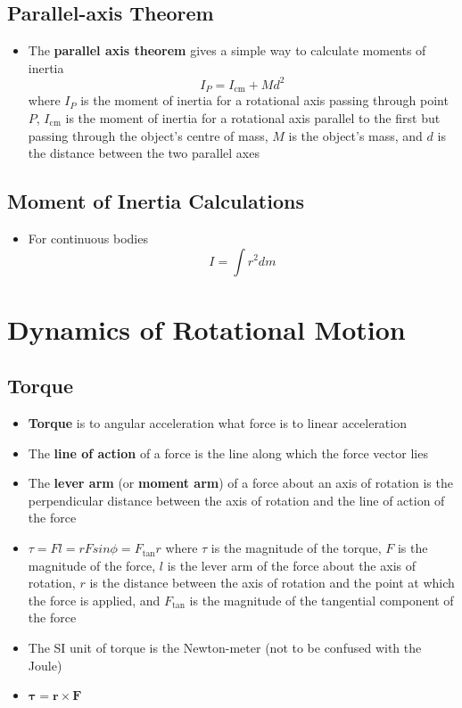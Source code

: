 \documentclass{article}
\begin{document}
\subsection{Parallel-axis Theorem}

\begin{itemize}
    \item The \textbf{parallel axis theorem} gives a simple way to calculate moments of inertia \[I_P=I_\textrm{cm}+Md^2\] where $I_P$ is the moment of inertia for a rotational axis passing through point $P$, $I_\textrm{cm}$ is the moment of inertia for a rotational axis parallel to the first but passing through the object's centre of mass, $M$ is the object's mass, and $d$ is the distance between the two parallel axes
\end{itemize}

\subsection{Moment of Inertia Calculations}

\begin{itemize}
    \item For continuous bodies \[I=\int r^2 dm\]
\end{itemize}

\section{Dynamics of Rotational Motion}

\subsection{Torque}

\begin{itemize}
    \item \textbf{Torque} is to angular acceleration what force is to linear acceleration

    \item The \textbf{line of action} of a force is the line along which the force vector lies

    \item The \textbf{lever arm} (or \textbf{moment arm}) of a force about an axis of rotation is the perpendicular distance between the axis of rotation and the line of action of the force

    \item $\tau=Fl=rFsin\phi=F_\textrm{tan}r$ where $\tau$ is the magnitude of the torque, $F$ is the magnitude of the force, $l$ is the lever arm of the force about the axis of rotation, $r$ is the distance between the axis of rotation and the point at which the force is applied, and $F_\textrm{tan}$ is the magnitude of the tangential component of the force

    \item The SI unit of torque is the Newton-meter (not to be confused with the Joule)

    \item $\boldsymbol\tau=\mathbf r\times\mathbf F$
\end{itemize}
\end{document}
